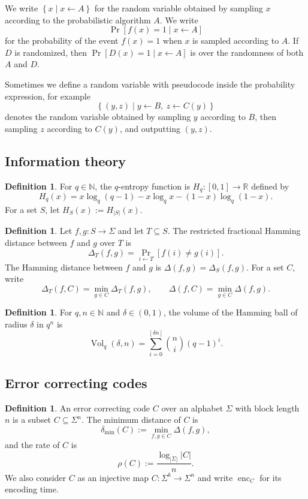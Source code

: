 \documentclass[11pt]{article}
\theoremstyle{plain}
\theoremstyle{definition}
\newtheorem{definition}[theorem]{Definition}
\newcommand{\N}{\mathbb{N}}
\newcommand{\R}{\mathbb{R}}
\newcommand{\distmin}{\delta_{\min}}
\newcommand{\set}[1]{\left\{#1\right\}}
\newcommand{\floor}[1]{\left\lfloor #1\right\rfloor}
\newcommand{\abs}[1]{\left|#1\right|}
\DeclareMathOperator{\Vol}{Vol}
\DeclareMathOperator{\enc}{enc}
\DeclareMathOperator*{\Prb}{Pr}
\begin{document}
We write $\set{x\mid x\leftarrow A}$ for the random variable obtained by sampling $x$ according to the probabilistic algorithm $A$. We write
\[
  \Prb[f(x)=1\mid x\leftarrow A]
\]
for the probability of the event $f(x)=1$ when $x$ is sampled according to $A$. If $D$ is randomized, then $\Prb[D(x)=1\mid x\leftarrow A]$ is over the randomness of both $A$ and $D$.

Sometimes we define a random variable with pseudocode inside the probability expression, for example
\[
 \set{(y,z)\;\bigg|\; y\leftarrow B,
       \ z\leftarrow C(y)}
\]
denotes the random variable obtained by sampling $y$ according to $B$, then sampling $z$ according to $C(y)$, and outputting $(y,z)$.

\subsection{Information theory}

\begin{definition}
For $q\in\N$, the $q$-entropy function is $H_q:[0,1]\to\R$ defined by
\[
  H_q(x)=x\log_q(q-1)-x\log_q x-(1-x)\log_q(1-x).
\]
For a set $S$, let $H_S(x):=H_{\abs{S}}(x)$.
\end{definition}

\begin{definition}
Let $f,g:S\to\Sigma$ and let $T\subseteq S$. The restricted fractional Hamming distance between $f$ and $g$ over $T$ is
\[
  \Delta_T(f,g)=\Prb_{i\leftarrow T}[f(i)\ne g(i)].
\]
The Hamming distance between $f$ and $g$ is $\Delta(f,g)=\Delta_S(f,g)$. For a set $C$, write
\[
  \Delta_T(f,C)=\min_{g\in C}\Delta_T(f,g),\qquad
  \Delta(f,C)=\min_{g\in C}\Delta(f,g).
\]
\end{definition}

\begin{definition}
For $q,n\in\N$ and $\delta\in(0,1)$, the volume of the Hamming ball of radius $\delta$ in $q^n$ is
\[
  \Vol_q(\delta,n)=\sum_{i=0}^{\floor{\delta n}} \binom{n}{i}(q-1)^i.
\]
\end{definition}

\subsection{Error correcting codes}

\begin{definition}
An error correcting code $C$ over an alphabet $\Sigma$ with block length $n$ is a subset $C\subseteq\Sigma^n$. The minimum distance of $C$ is
\[
  \distmin(C):=\min_{f,g\in C}\Delta(f,g),
\]
and the rate of $C$ is
\[
  \rho(C):=\frac{\log_{\abs{\Sigma}}\abs{C}}{n}.
\]
We also consider $C$ as an injective map $C:\Sigma^k\to\Sigma^n$ and write $\enc_C$ for its encoding time.
\end{definition}
\end{document}
